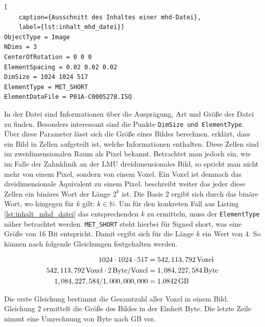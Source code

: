 \begin{lstlisting}[
	caption={Ausschnitt des Inhaltes einer mhd-Datei},
	label={lst:inhalt_mhd_datei}]
ObjectType = Image
NDims = 3
CenterOfRotation = 0 0 0
ElementSpacing = 0.02 0.02 0.02
DimSize = 1024 1024 517
ElementType = MET_SHORT
ElementDataFile = P01A-C0005278.ISQ
\end{lstlisting}

In der Datei sind Informationen über die Ausprägung, Art und Größe der Datei zu finden.
Besonders interessant sind die Punkte \texttt{DimSize und ElementType}. Über
diese Parameter lässt sich die Größe eines Bildes berechnen. \citet[Seite 10-11]{burger2009}
erklärt, dass ein Bild in Zellen aufgeteilt ist, welche Informationen enthalten.
Diese Zellen sind im zweidimensionalen Raum als Pixel bekannt. Betrachtet man jedoch
ein, wie im Falle der Zahnklinik an der \ac{LMU} dreidimensionales Bild, so
spricht man nicht mehr von einem Pixel, sondern von einem Voxel. Ein Voxel ist
demnach das dreidimensionale Äquivalent zu einem Pixel. \citet[Seite 10-11]{burger2009}
beschreibt weiter das jeder diese Zellen ein binäres Wort der Länge $2^{k}$ ist.
Die Basis 2 ergibt sich durch das binäre Wort, wo hingegen für $k$ gilt:
$k \in \mathbb{N}$. Um für den konkreten Fall aus Listing \ref{lst:inhalt_mhd_datei}
das entsprechenden $k$ zu ermitteln, muss der \texttt{ElementType} näher betrachtet
werden. \texttt{MET\_SHORT} steht hierbei für Signed short, was eine Größe von
16 Bit entspricht. Damit ergibt sich für die Länge $k$ ein Wert von 4. So können
nach \citet[Seite 10-11]{burger2009} folgende Gleichungen festgehalten werden.

\begin{align}
	\label{equ:größe_bestimmen}1024 \cdot 1024 \cdot 517    & = 542,113,792 \, \text{Voxel}\notag  \\
	542,113,792 \, \text{Voxel}\cdot 2 \, \text{Byte/Voxel} & = 1,084,227,584 \, \text{Byte}\notag \\
	1,084,227,584 / 1,000,000,000                           & = 1.0842 \, \text{GB}
\end{align}

Die erste Gleichung bestimmt die Gesamtzahl aller Voxel in einem Bild. Gleichung
2 ermittelt die Größe des Bildes in der Einheit Byte. Die letzte Zeile nimmt
eine Umrechnung von Byte nach \ac{GB} vor.

